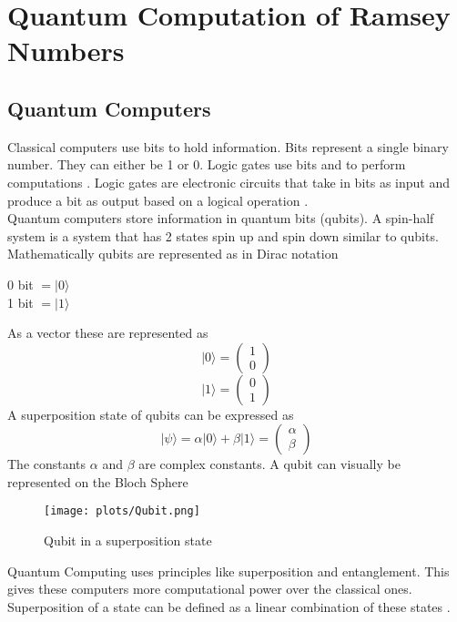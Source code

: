 \documentclass{Assignment}
\begin{document}
\section{Quantum Computation of Ramsey Numbers}
\subsection{Quantum Computers}
Classical computers use bits to hold information.
Bits represent a single binary number.
They can either be 1 or 0.
Logic gates use bits and to perform computations \cite{deutsch1985quantum}.
Logic gates are electronic circuits that take in bits as input and produce a bit as output based on a logical operation \cite{Jaeger1997}.\\
Quantum computers store information in quantum bits (qubits).
A spin-half system is a system that has 2 states spin up and spin down similar to qubits.
Mathematically qubits are represented  as in Dirac notation 
\begin{center}
	0 bit $=|0\rangle $ \\1 bit $=  |1\rangle$
\end{center}
As a vector these are represented as 
$$|0\rangle = \begin{pmatrix}
	1\\0
\end{pmatrix}$$
$$|1\rangle = \begin{pmatrix}
	0\\1
\end{pmatrix}$$
A superposition state of qubits can be expressed as \begin{equation}
	|\psi\rangle = \alpha|0\rangle + \beta|1\rangle = \begin{pmatrix}
		\alpha\\\beta
		\label{superposition}
\end{pmatrix} \end{equation}
The constants $\alpha $ and $ \beta$ are complex constants.
A qubit can visually be represented on the Bloch Sphere 
\begin{figure}[H]
	\begin{center}
		\texttt{[image: plots/Qubit.png]}
		\caption{Qubit in a superposition state}
	\end{center}
\end{figure}
Quantum Computing uses principles like superposition and entanglement.
This gives these computers more computational power over the classical ones.
Superposition of a state can be defined as a linear combination of these states \cite{mcintyre_quantum_2012}.
\end{document}
